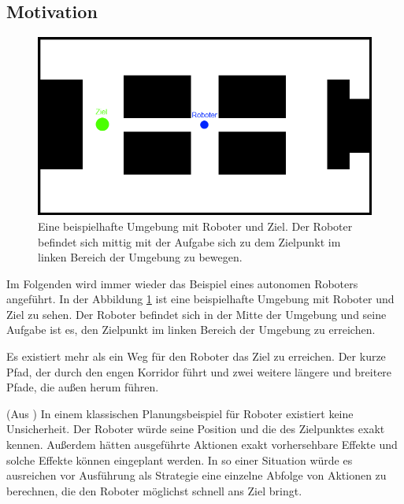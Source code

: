 \documentclass[a4paper]{IEEEtran}
\begin{document}
\subsection{Motivation}
\begin{figure}[ht]
	\centering
	\includegraphics[scale=0.42]{images/autnmRobot_basicSituation.png}
	\caption{Eine beispielhafte Umgebung mit Roboter und Ziel. Der Roboter befindet sich mittig mit der Aufgabe sich zu dem Zielpunkt im linken Bereich der Umgebung zu bewegen.}
	\label{fig:holoch_autnmRob_bSit}
\end{figure}
Im Folgenden wird immer wieder das Beispiel eines autonomen Roboters angeführt. In der Abbildung \ref{fig:holoch_autnmRob_bSit} ist eine beispielhafte Umgebung mit Roboter und Ziel zu sehen. Der Roboter befindet sich in der Mitte der Umgebung und seine Aufgabe ist es, den Zielpunkt im linken Bereich der Umgebung zu erreichen. 

Es existiert mehr als ein Weg für den Roboter das Ziel zu erreichen. Der kurze Pfad, der durch den engen Korridor führt und zwei weitere längere und breitere Pfade, die außen herum führen.

(Aus \cite{PR_ThrunBurgardFox}) In einem klassischen Planungsbeispiel für Roboter existiert keine Unsicherheit. Der Roboter würde seine Position und die des Zielpunktes exakt kennen. Außerdem hätten ausgeführte Aktionen exakt vorhersehbare Effekte und solche Effekte können eingeplant werden. In so einer Situation würde es ausreichen vor Ausführung als Strategie eine einzelne Abfolge von Aktionen zu berechnen, die den Roboter möglichst schnell ans Ziel bringt.
\end{document}
